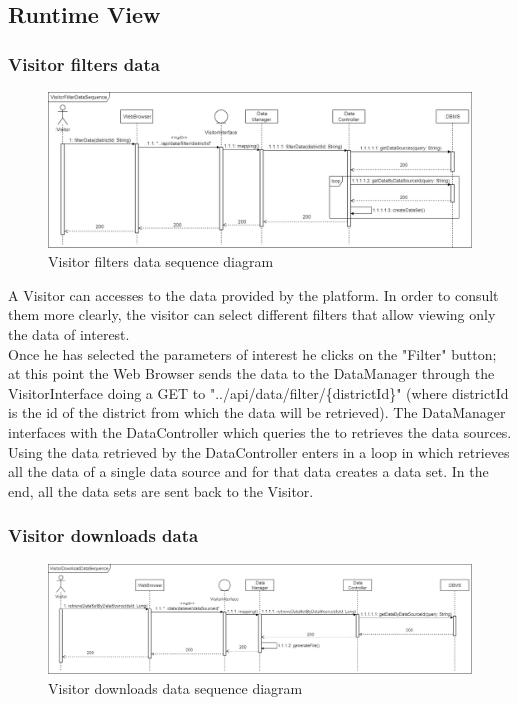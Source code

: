 \subsection{Runtime View}

\subsubsection{Visitor filters data}

\begin{figure}[h!]
        \centering
        \includegraphics[scale=0.30]{images/runtime_view/visitor_filter_data_runtime_view_diagram.png}
        \caption{Visitor filters data sequence diagram}
        \label{fig:visitor_filters_data_sequence_diagram}
\end{figure}
\FloatBarrier

A Visitor can accesses to the data provided by the platform. In order to consult them more clearly, the visitor can select different filters that allow viewing only the data of interest.\\
Once he has selected the parameters of interest he clicks on the "Filter" button; at this point the Web Browser sends the data to the DataManager through the VisitorInterface doing a GET to "../api/data/filter/\{districtId\}" (where districtId is the id of the district from which the data will be retrieved). The DataManager interfaces with the DataController which queries the to retrieves the data sources.\\
Using the data retrieved by the DataController enters in a loop in which retrieves all the data of a single data source and for that data creates a data set. In the end, all the data sets are sent back to the Visitor.\\

\subsubsection{Visitor downloads data}

\begin{figure}[h!]
        \centering
        \includegraphics[scale=0.27]{images/runtime_view/visitor_download_data_runtime_view_diagram.png}
        \caption{Visitor downloads data sequence diagram}
        \label{fig:visitor_downloads_data_sequence_diagram}
\end{figure}
\FloatBarrier

